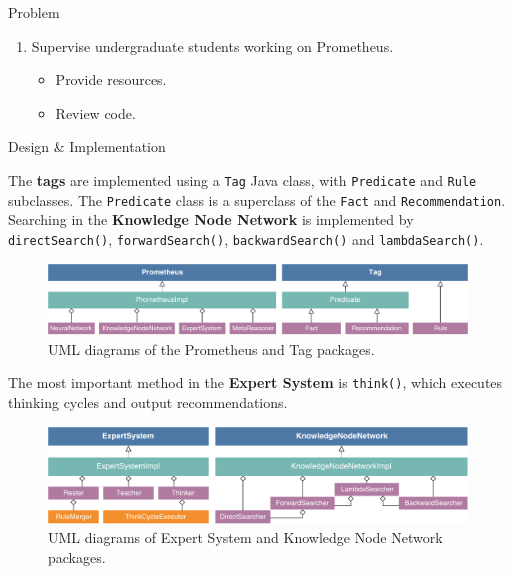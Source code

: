 \documentclass[final]{beamer} %
\newcommand{\code}[1]{\texttt{#1}}
\begin{document}
\begin{frame}
\begin{columns}
\begin{column}{.33\textwidth}
{\begin{block}{Problem}
\begin{enumerate}
						\item Supervise undergraduate students working on Prometheus.
						\begin{itemize}
							\item Provide resources.
							\item Review code.
						\end{itemize}
					\end{enumerate}
				\end{block}
					
				\begin{block}{Design \& Implementation}
					
					\parbox{0.99\textwidth}{The \textbf{tags} are implemented using a \code{Tag} Java class, with \code{Predicate} and \code{Rule} subclasses. The \code{Predicate} class is a superclass of the \code{Fact} and \code{Recommendation}. Searching in the \textbf{Knowledge Node Network} is implemented by \code{directSearch()}, \code{forwardSearch()}, \code{backwardSearch()} and \code{lambdaSearch()}.}
				
					\begin{figure}
						\centering
						\includegraphics[width=0.99\textwidth]{figures/uml_combined_1.pdf}
						\caption{UML diagrams of the Prometheus and Tag packages.}
					\end{figure}			
				
					\parbox{0.99\textwidth}{
					The most important method in the \textbf{Expert System} is \code{think()}, which executes thinking cycles and output recommendations.}
				
					\begin{figure}
						\centering
						\includegraphics[width=0.99\textwidth]{figures/uml_combined_3.pdf}
						\caption{UML diagrams of Expert System and Knowledge Node Network packages.}
					\end{figure}
				

\end{block}}
\end{column}
\end{columns}
\end{frame}
\end{document}
